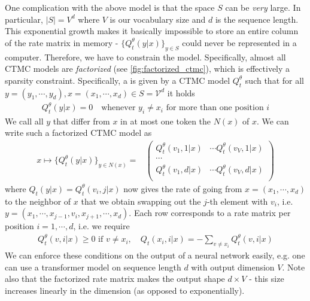 One complication with the above model is that the space $S$ can be \emph{very} large. In particular, $|S|=V^d$ where $V$ is our vocabulary size and $d$ is the sequence length. This exponential growth makes it basically impossible to store an entire column of the rate matrix in memory - $\{Q_t^\theta(y|x)\}_{y\in S}$ could never be represented in a computer. Therefore, we have to constrain the model.  Specifically, almost all CTMC models are \emph{factorized} (see \cref{fig:factorized_ctmc}), which is effectively a sparsity constraint. Specifically, a  is given by a CTMC model $Q_t^\theta$ such that for all $y=(y_1,\cdots, y_d),x=(x_1,\cdots,x_d)\in S=\mathcal{V}^d$ it holds
\begin{align*}
Q_t^\theta(y|x)=0\quad \text{whenever }y_i\neq x_i\text{ for more than one position }i
\end{align*}
We call all $y$ that differ from $x$ in at most one token the  $N(x)$ of $x$. We can write such a factorized CTMC model as
\begin{align*}  x\mapsto \{Q_t^\theta(y|x)\}_{y\in N(x)} 
=&
\begin{pmatrix}
Q_t^\theta(v_1,1|x) & \cdots Q_t^\theta(v_{V},1|x)\\
\cdots\\
Q_t^\theta(v_1,d|x) & \cdots Q_t^\theta(v_{V},d|x)\\
\end{pmatrix}
\end{align*}
where $Q_t(y|x)=Q_t^\theta(v_i,j|x)$ now gives the rate of going from $x=(x_1,\cdots,x_d)$ to the neighbor of $x$ that we obtain swapping out the $j$-th element with $v_i$, i.e. $y=(x_1,\cdots,x_{j-1},v_{i},x_{j+1},\cdots,x_{d})$. Each row corresponds to a rate matrix per position $i=1,\cdots,d$, i.e. we require 
\begin{align*}
    Q_t^\theta(v,i|x)\geq 0\text{ if }v\neq x_i,\quad Q_t(x_i,i|x)=-\sum\limits_{v\neq x_i}Q_t^\theta(v,i|x)
\end{align*}
We can enforce these conditions on the output of a neural network easily, e.g. one can use a  transformer model on sequence length $d$ with output dimension $V$. Note also that the factorized rate matrix makes the output shape $d\times V$ - this size increases linearly in the dimension (as opposed to exponentially). 


